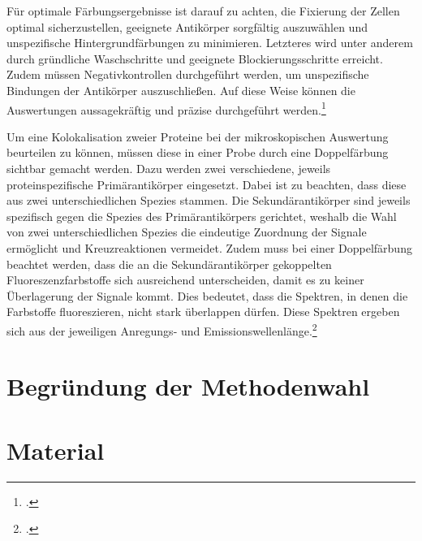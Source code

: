 Für optimale Färbungsergebnisse ist darauf zu achten, die Fixierung der
Zellen optimal sicherzustellen, geeignete Antikörper sorgfältig
auszuwählen und unspezifische Hintergrundfärbungen zu minimieren.
Letzteres wird unter anderem durch gründliche Waschschritte und
geeignete Blockierungsschritte erreicht. Zudem müssen Negativkontrollen
durchgeführt werden, um unspezifische Bindungen der Antikörper
auszuschließen. Auf diese Weise können die Auswertungen aussagekräftig
und präzise durchgeführt
werden.\footcite{LeicaIHC2026}

Um eine Kolokalisation zweier Proteine bei der mikroskopischen
Auswertung beurteilen zu können, müssen diese in einer Probe durch eine
Doppelfärbung sichtbar gemacht werden. Dazu werden zwei verschiedene,
jeweils proteinspezifische Primärantikörper eingesetzt. Dabei ist zu
beachten, dass diese aus zwei unterschiedlichen Spezies stammen. Die
Sekundärantikörper sind jeweils spezifisch gegen die Spezies des
Primärantikörpers gerichtet, weshalb die Wahl von zwei
unterschiedlichen Spezies die eindeutige Zuordnung der Signale
ermöglicht und Kreuzreaktionen vermeidet. Zudem muss bei einer
Doppelfärbung beachtet werden, dass die an die Sekundärantikörper
gekoppelten Fluoreszenzfarbstoffe sich ausreichend unterscheiden, damit
es zu keiner Überlagerung der Signale kommt. Dies bedeutet, dass die
Spektren, in denen die Farbstoffe fluoreszieren, nicht stark überlappen
dürfen. Diese Spektren ergeben sich aus der jeweiligen Anregungs- und
Emissionswellenlänge.\footcite{Hackenberg}
\section{Begründung der Methodenwahl}
\section{Material}